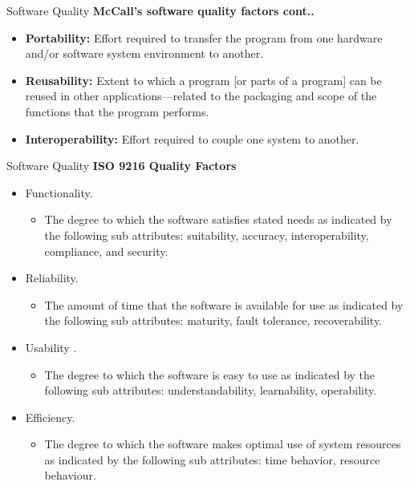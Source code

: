\documentclass{beamer}
\begin{document}
\begin{frame}{Software Quality}
	\textbf{McCall’s software quality factors cont.. }
	\begin{itemize}
		\item \textbf{Portability:} Effort required to transfer the program from one hardware and/or software system environment to another. 
		\item \textbf{Reusability:} Extent to which a program [or parts of a program] can be reused in other applications—related to the packaging and scope of the functions that the program performs.
		\item \textbf{Interoperability:} Effort required to couple one system to another.
	\end{itemize}
\end{frame}
\begin{frame}{Software Quality}
	\textbf{ISO 9216 Quality Factors}
	\begin{itemize}
		\item Functionality.
		\begin{itemize}
			\item  The degree to which the software satisfies stated needs as indicated by the following sub attributes: suitability, accuracy, interoperability, compliance, and security.
		\end{itemize}
		\item Reliability.
		\begin{itemize}
			\item  The amount of time that the software is available for use as indicated by the following sub attributes: maturity, fault tolerance, recoverability.
		\end{itemize}
		\item Usability .
		\begin{itemize}
			\item  The degree to which the software is easy to use as indicated by the following sub attributes: understandability,  learnability, operability.
		\end{itemize}
		\item Efficiency.
		\begin{itemize}
			\item  The degree to which the software makes optimal use of system resources as indicated by the following sub attributes: time behavior, resource behaviour.
		\end{itemize}
	\end{itemize}
\end{frame}
\end{document}
